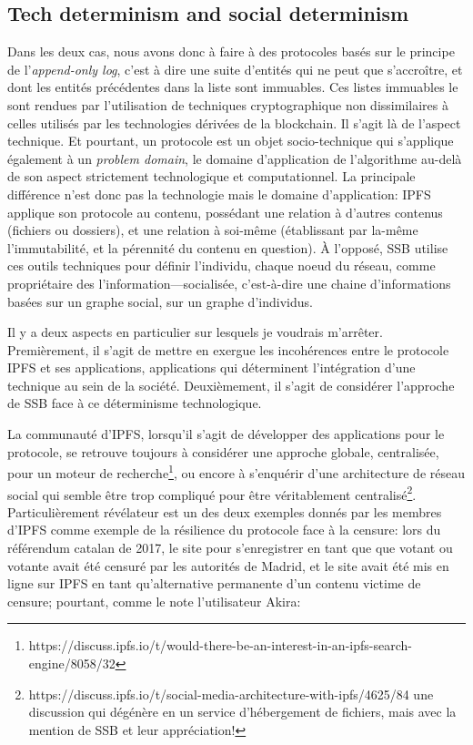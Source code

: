 \documentclass{article}
\begin{document}
\subsection{Tech determinism and social determinism}

Dans les deux cas, nous avons donc à faire à des protocoles basés sur le principe de l'\emph{append-only log}, c'est à dire une suite d'entités qui ne peut que s'accroître, et dont les entités précédentes dans la liste sont immuables. Ces listes immuables le sont rendues par l'utilisation de techniques cryptographique non dissimilaires à celles utilisés par les technologies dérivées de la blockchain. Il s'agit là de l'aspect technique. Et pourtant, un protocole est un objet socio-technique qui s'applique également à un \emph{problem domain}, le domaine d'application de l'algorithme au-delà de son aspect strictement technologique et computationnel. La principale différence n'est donc pas la technologie mais le domaine d'application: IPFS applique son protocole au contenu, possédant une relation à d'autres contenus (fichiers ou dossiers), et une relation à soi-même (établissant par la-même l'immutabilité, et la pérennité du contenu en question). À l'opposé, SSB utilise ces outils techniques pour définir l'individu, chaque noeud du réseau, comme propriétaire des l'information—socialisée, c'est-à-dire une chaine d'informations basées sur un graphe social, sur un graphe d'individus.

Il y a deux aspects en particulier sur lesquels je voudrais m'arrêter. Premièrement, il s'agit de mettre en exergue les incohérences entre le protocole IPFS et ses applications, applications qui déterminent l'intégration d'une technique au sein de la société. Deuxièmement, il s'agit de considérer l'approche de SSB face à ce déterminisme technologique.

La communauté d'IPFS, lorsqu'il s'agit de développer des applications pour le protocole, se retrouve toujours à considérer une approche globale, centralisée, pour un moteur de recherche\footnote{https://discuss.ipfs.io/t/would-there-be-an-interest-in-an-ipfs-search-engine/8058/32}, ou encore à s'enquérir d'une architecture de réseau social qui semble être trop compliqué pour être véritablement centralisé\footnote{https://discuss.ipfs.io/t/social-media-architecture-with-ipfs/4625/84 une discussion qui dégénère en un service d'hébergement de fichiers, mais avec la mention de SSB et leur appréciation!}. Particulièrement révélateur est un des deux exemples donnés par les membres d'IPFS comme exemple de la résilience du protocole face à la censure: lors du référendum catalan de 2017, le site pour s'enregistrer en tant que que votant ou votante avait été censuré par les autorités de Madrid, et le site avait été mis en ligne sur IPFS en tant qu'alternative permanente d'un contenu victime de censure; pourtant, comme le note l'utilisateur Akira:
\end{document}

